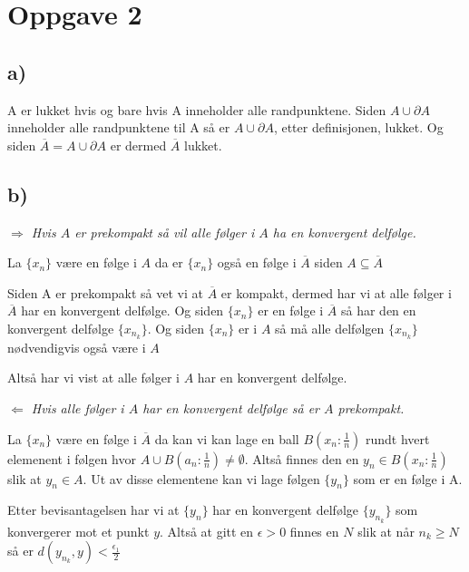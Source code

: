 \documentclass{article}
\begin{document}
                    \section*{Oppgave 2}
                    \subsection*{a)}

                    A er lukket hvis og bare hvis A inneholder alle randpunktene. Siden $A \cup \partial A$ inneholder alle randpunktene til A så er $A \cup \partial A$, etter definisjonen, lukket. Og siden $\overline{A} = A \cup \partial A $ er dermed $\overline A $ lukket.





                    \subsection*{b)}
                    \textit{$\pmb{\Rightarrow}$ Hvis $A$ er prekompakt så vil alle følger i $A$ ha en konvergent delfølge.}

                    La $\{x_n\}$ være en følge i $A$ da er $\{x_n\}$ også en følge i $\overline{A}$ siden $A \subseteq \overline{A}$

                    Siden A er prekompakt så vet vi at $\overline{A}$ er kompakt, dermed har vi at alle følger i $\overline{A}$ har en konvergent delfølge. Og siden $\{x_{n}\}$ er en følge i $\overline{A}$ så har den en konvergent delfølge $\{x_{n_{k}}\}$. Og siden $\{x_n\}$ er i $A$ så må alle delfølgen $\{x_{n_k}\}$ nødvendigvis også være i $A$

                    Altså har vi vist at alle følger i $A$ har en konvergent delfølge.




                    \textit{$\pmb{\Leftarrow}$ Hvis alle følger i $A$ har en konvergent delfølge så er $A$ prekompakt.}

                    La  $\{x_n\}$ være en følge i $\overline{A}$ da kan vi kan lage en ball $B(x_n : \frac{1}{n})$ rundt hvert elemenent i følgen hvor $A \cup B(a_n : \frac{1}{n}) \neq \emptyset$. Altså finnes den en $y_n \in B(x_n : \frac{1}{n})$ slik at $y_n \in A$. Ut av disse elementene kan vi lage følgen $\{y_n\}$ som er en følge i A.

                    Etter bevisantagelsen har vi at $\{y_n\}$ har en konvergent delfølge $\{y_{n_k}\}$ som konvergerer mot et punkt $y$. Altså at gitt en $\epsilon > 0$ finnes en $N$ slik at når $n_k \geq N$ så er $d(y_{n_k}, y) < \frac{\epsilon_1}{2}$
\end{document}
